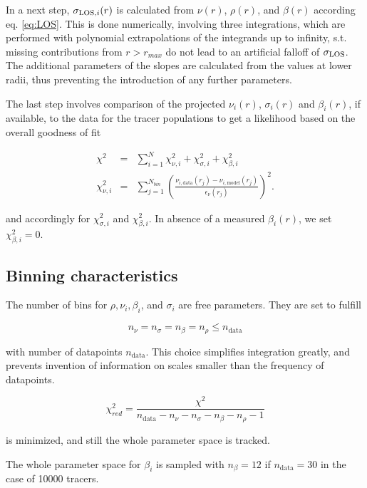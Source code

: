 In a next step, $\sigma_{\text{LOS},i}(r)$ is calculated from $\nu(r)$, $\rho(r)$,
and $\beta(r)$ according eq. \ref{eq:LOS}. This is done numerically,
involving three integrations, which are performed with polynomial
extrapolations of the integrands up to infinity, s.t. missing
contributions from $r>r_{max}$ do not lead to an artificial falloff of
$\sigma_{\text{LOS}}$. The additional parameters of the slopes are calculated from
the values at lower radii, thus preventing the introduction of any
further parameters.

The last step involves comparison of the projected $\nu_i(r)$,
$\sigma_i(r)$ and $\beta_i(r)$, if available, to the data for the
tracer populations to get a likelihood based on the overall
goodness of fit

\begin{eqnarray}
\chi^2 &=& \sum_{i=1}^N \chi_{\nu,i}^2 + \chi_{\sigma,i}^2 + \chi_{\beta,i}^2\\
\chi_{\nu,i}^2 &=& \sum_{j=1}^{N_{bin}} \left(\frac{\nu_{i,\text{data}}(r_j)-\nu_{i,\text{model}}(r_j)}{\epsilon_\nu(r_j)}\right)^2.
\end{eqnarray}

and accordingly for $\chi_{\sigma,i}^2$ and $\chi_{\beta,i}^2$. In
absence of a measured $\beta_i(r)$, we set $\chi_{\beta,i}^2=0$.

\subsection{Binning characteristics}

The number of bins for $\rho, \nu_i, \beta_i$, and $\sigma_i$ are free
parameters. They are set to fulfill

\begin{equation}
n_\nu = n_\sigma = n_\beta = n_\rho \leq n_{\text{data}}
\end{equation}

with number of datapoints $n_{\text{data}}$. This choice simplifies
integration greatly, and prevents invention of information on scales
smaller than the frequency of datapoints.


\begin{equation}
\chi^2_{red} = \frac{\chi^2}{n_{\text{data}} - n_\nu - n_\sigma - n_\beta - n_\rho -1}
\end{equation}

is minimized, and still the whole parameter space is tracked.

The whole parameter space for $\beta_i$ is sampled with $n_\beta=12$
if $n_{\text{data}}=30$ in the case of 10000 tracers.

